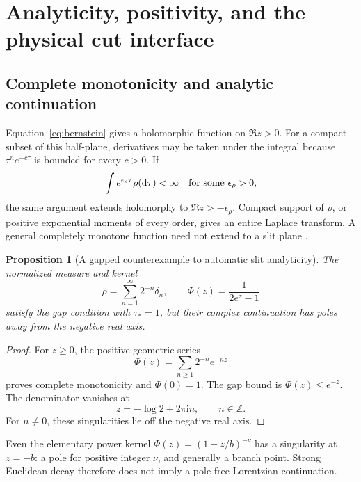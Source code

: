 \documentclass[final,5p,times,twocolumn,numbers,nopreprintline]{elsarticle}
\numberwithin{equation}{section}
\newtheorem{proposition}[theorem]{Proposition}
\theoremstyle{definition}
\theoremstyle{remark}
\newcommand{\dd}{\mathop{}\!\mathrm d}
\newcommand{\ii}{\mathrm i}
\newcommand{\Ph}{\Phi}
\begin{document}
\section{Analyticity, positivity, and the physical cut interface}
\label{sec:analytic}

\subsection{Complete monotonicity and analytic continuation}

Equation~\eqref{eq:bernstein} gives a holomorphic function on
\(\Re z>0\). For a compact subset of this half-plane, derivatives
may be taken under the integral because
\(\tau^n e^{-c\tau}\) is bounded for every \(c>0\).
If
\begin{equation}
 \int e^{\epsilon_\rho\tau}\rho(\dd\tau)<\infty
 \quad\hbox{for some }\epsilon_\rho>0,
 \label{eq:exponential-moment}
\end{equation}
the same argument extends holomorphy to
\(\Re z>-\epsilon_\rho\).
Compact support of \(\rho\), or positive exponential moments of
every order, gives an entire Laplace transform. A general
completely monotone function need not extend to a slit plane
\cite{Bernstein1929,Widder1941}.

\begin{proposition}[A gapped counterexample to automatic slit analyticity]
\label{prop:meromorphic-counterexample}
The normalized measure and kernel
\begin{equation}
 \rho=\sum_{n=1}^\infty2^{-n}\delta_n,\qquad
 \Ph(z)=\frac1{2e^z-1}
 \label{eq:meromorphic-counterexample}
\end{equation}
satisfy the gap condition with \(\tau_*=1\), but their complex
continuation has poles away from the negative real axis.
\end{proposition}

\begin{proof}
For \(z\geq0\), the positive geometric series
\[
 \Ph(z)=\sum_{n\geq1}2^{-n}e^{-nz}
\]
proves complete monotonicity and \(\Ph(0)=1\). The gap bound is
\(\Ph(z)\leq e^{-z}\). The denominator vanishes at
\[
 z=-\log2+2\pi\ii n,\qquad n\in\mathbb Z.
\]
For \(n\neq0\), these singularities lie off the negative real axis.
\end{proof}

Even the elementary power kernel
\(\Ph(z)=(1+z/b)^{-\nu}\) has a singularity at \(z=-b\):
a pole for positive integer \(\nu\), and generally a branch point.
Strong Euclidean decay therefore does not imply a pole-free
Lorentzian continuation.
\end{document}

